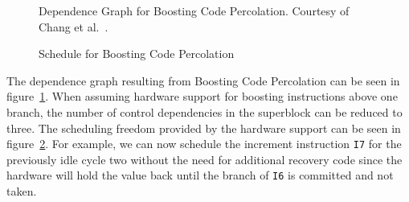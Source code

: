\begin{center}
    \begin{minipage}{.52\textwidth}
        \begin{figure}[H]
            \centering
            
            \caption[Dependence Graph for Boosting Code Percolation]{Dependence Graph for Boosting Code Percolation. Courtesy of Chang et al.~\cite{chang95}.}
            \label{fig:boosting_cfg}
\end{figure}
    \end{minipage}\hfill
    \begin{minipage}{.46\textwidth}
\begin{figure}[H]
            \centering
            \resizebox{1\textwidth}{!}{
            
        }
        \caption[Schedule for Boosting Code Percolation]{Schedule for Boosting Code Percolation}
        \label{fig:boosted_motion}
\end{figure}
    \end{minipage}
\end{center} 
The dependence graph resulting from Boosting Code Percolation can be seen in figure~\ref{fig:boosting_cfg}. When assuming hardware support for boosting instructions above one branch, the number of control dependencies in the superblock can be reduced to three. The scheduling freedom provided by the hardware support can be seen in figure~\ref{fig:boosted_motion}. For example, we can now schedule the increment instruction \texttt{I7} for the previously idle cycle two without the need for additional recovery code since the hardware will hold the value back until the branch of \texttt{I6} is committed and not taken. 

